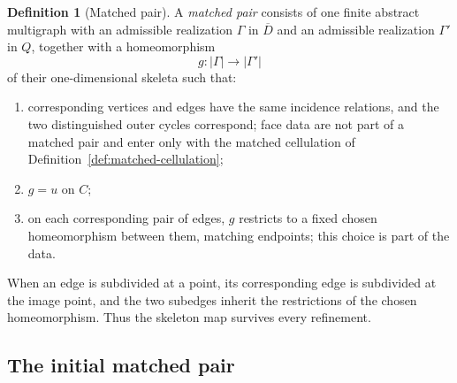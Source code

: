 \documentclass[11pt]{article}
\theoremstyle{mainplain}
\theoremstyle{mainroman}
\theoremstyle{definition}
\newtheorem{definition}[theorem]{Definition}
\providecommand{\tightlist}{\setlength{\itemsep}{0pt}\setlength{\parskip}{0pt}}
\numberwithin{equation}{section}
\begin{document}
\begin{definition}[Matched pair]\label{def:matched-pair}
A \emph{matched pair} consists of one finite abstract multigraph with an admissible realization \(\Gamma\) in \(\overline D\) and an admissible realization \(\Gamma'\) in \(Q\), together with a homeomorphism
\[
g:|\Gamma|\longrightarrow|\Gamma'|
\]
of their one-dimensional skeleta such that:

\begin{enumerate}
\def\labelenumi{\arabic{enumi}.}
\tightlist
\item
  corresponding vertices and edges have the same incidence
  relations, and the two distinguished outer cycles correspond; face
  data are not part of a matched pair and enter only with the matched
  cellulation of Definition~\ref{def:matched-cellulation};
\item
  \(g=u\) on \(C\);
\item
  on each corresponding pair of edges, \(g\) restricts to a fixed
  chosen homeomorphism between them, matching endpoints; this choice
  is part of the data.
\end{enumerate}

When an edge is subdivided at a point, its corresponding edge is subdivided at the image point, and the two subedges inherit the restrictions of the chosen homeomorphism. Thus the skeleton map survives every refinement.
\end{definition}

\subsection{The initial matched pair}\label{the-initial-matched-pair}
\end{document}
